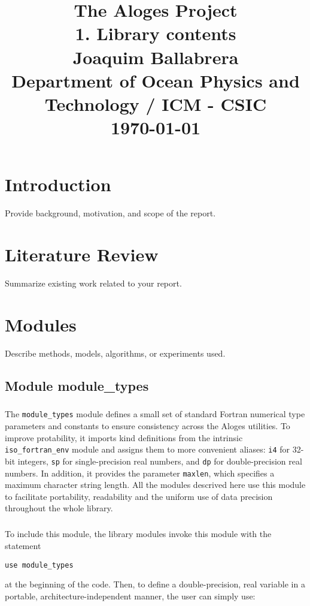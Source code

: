 \documentclass[12pt,a4paper]{report}
\title{
    \vspace{2in}
    \Huge \textbf{The Aloges Project} \\
    \vspace{0.5in}
    \Large 1. Library contents\\
    \vspace{1in}
    \textbf{Joaquim Ballabrera} \\
    Department of Ocean Physics and Technology / ICM - CSIC \\
    \vfill
    \vfill
    \today
}
\author{}
\date{}
\begin{document}
\maketitle
{}
\tableofcontents
\listoffigures
\listoftables

\newpage
{}

\chapter{Introduction}
Provide background, motivation, and scope of the report.

\chapter{Literature Review}
Summarize existing work related to your report.

\chapter{Modules}
Describe methods, models, algorithms, or experiments used.

\section{Module module\_types}

\paragraph{} 
The \texttt{module\_types} module defines a small set of standard Fortran 
numerical type parameters and constants to ensure consistency across the Aloges utilities. To improve protability, it imports kind definitions from the intrinsic \texttt{iso\_fortran\_env} module and assigns 
them to more convenient aliases: \texttt{i4} for 32-bit integers, \texttt{sp} for 
single-precision real numbers, and \texttt{dp} for double-precision real numbers. 
In addition, it provides the parameter \texttt{maxlen}, which specifies a maximum 
character string length. All the modules descrived here use this module to
facilitate portability, readability and the uniform use of data precision throughout the whole library.

\paragraph{}
To include this module, the library modules invoke this module with the statement
\begin{lstlisting}
use module_types
\end{lstlisting}
\noindent at the beginning of the code. Then, to define a double-precision, real variable in a portable, architecture-independent manner, the user can simply use:
\end{document}
